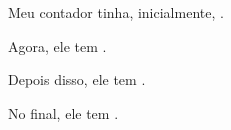 \documentclass{article}
\newcounter{x}
\begin{document}
Meu contador tinha, inicialmente, \thex.

\addtocounter{x}{2}

Agora, ele tem \thex.

\setcounter{x}{10}

Depois disso, ele tem \thex.

\addtocounter{x}{-3}

No final, ele tem \thex.
\end{document}

